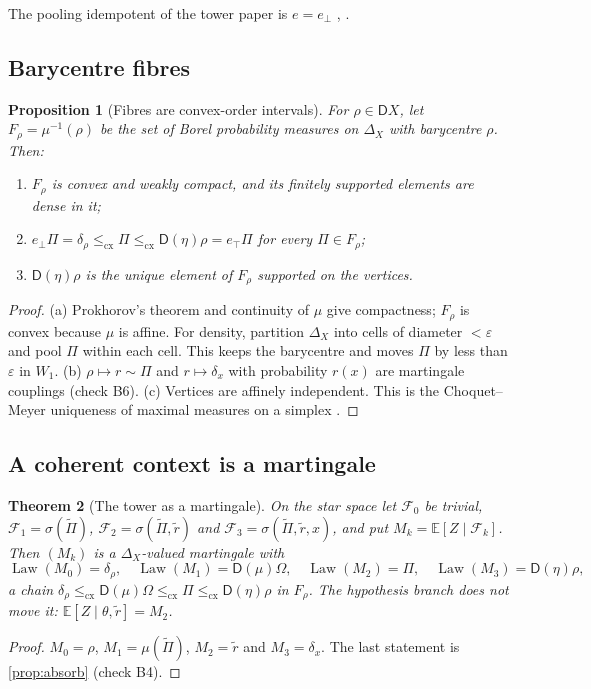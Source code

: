 \documentclass[11pt]{article}
\newtheorem{theorem}{Theorem}[section]
\newtheorem{proposition}[theorem]{Proposition}
\theoremstyle{definition}
\newcommand{\D}{\mathsf D}
\newcommand{\cx}{\le_{\mathrm{cx}}}
\newcommand{\Law}{\operatorname{Law}}
\newcommand{\EE}{\mathbb E}
\newcommand{\ebot}{e_{\perp}}
\newcommand{\etop}{e_{\top}}
\newcommand{\Pt}{\widetilde\Pi}
\newcommand{\rr}{\tilde r}
\begin{document}
The pooling idempotent of the tower paper is $e=\ebot$ \cite[\S13.6]{Tower}, \cite{PoolingNote}.

\subsection{Barycentre fibres}
\begin{proposition}[Fibres are convex-order intervals]\label{prop:fibre}
For $\rho\in\D X$, let $F_\rho=\mu^{-1}(\rho)$ be the set of Borel probability measures on $\Delta_X$ with barycentre $\rho$. Then:
\begin{enumerate}[label=(\alph*)]
\item $F_\rho$ is convex and weakly compact, and its finitely supported elements are dense in it;
\item $\ebot\Pi=\delta_\rho\cx\Pi\cx\D(\eta)\rho=\etop\Pi$ for every $\Pi\in F_\rho$;
\item $\D(\eta)\rho$ is the unique element of $F_\rho$ supported on the vertices.
\end{enumerate}
\end{proposition}
\begin{proof}
(a) Prokhorov's theorem and continuity of $\mu$ give compactness; $F_\rho$ is convex because $\mu$ is affine. For density, partition
$\Delta_X$ into cells of diameter $<\varepsilon$ and pool $\Pi$ within each cell. This keeps the barycentre and moves $\Pi$ by less
than $\varepsilon$ in $W_1$.
(b) $\rho\mapsto r\sim\Pi$ and $r\mapsto\delta_x$ with probability $r(x)$ are martingale couplings (check B6).
(c) Vertices are affinely independent. This is the Choquet--Meyer uniqueness of maximal measures on a simplex \cite{Phelps2001}.
\end{proof}

\subsection{A coherent context is a martingale}
\begin{theorem}[The tower as a martingale]\label{thm:martingale}
On the star space let $\mathcal F_0$ be trivial, $\mathcal F_1=\sigma(\Pt)$, $\mathcal F_2=\sigma(\Pt,\rr)$ and
$\mathcal F_3=\sigma(\Pt,\rr,x)$, and put $M_k=\EE[Z\mid\mathcal F_k]$. Then $(M_k)$ is a $\Delta_X$-valued martingale with
\[
\Law(M_0)=\delta_\rho,\quad\Law(M_1)=\D(\mu)\Omega,\quad\Law(M_2)=\Pi,\quad\Law(M_3)=\D(\eta)\rho,
\]
a chain $\delta_\rho\cx\D(\mu)\Omega\cx\Pi\cx\D(\eta)\rho$ in $F_\rho$. The hypothesis branch does not move it:
$\EE[Z\mid\theta,\rr]=M_2$.
\end{theorem}
\begin{proof}
$M_0=\rho$, $M_1=\mu(\Pt)$, $M_2=\rr$ and $M_3=\delta_x$. The last statement is \cref{prop:absorb} (check B4).
\end{proof}
\end{document}
